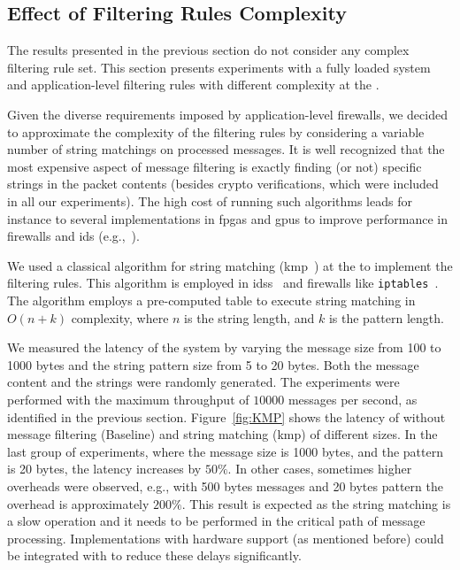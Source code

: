 \subsection{Effect of Filtering Rules Complexity}


The results presented in the previous section do not consider any complex filtering rule set.
This section presents experiments with a fully loaded system and application-level filtering rules with different complexity at the \repsieves.

Given the diverse requirements imposed by application-level firewalls, we decided to approximate the complexity of the filtering rules by considering a variable number of string matchings on processed messages.  It is well recognized that the most expensive aspect of message filtering is exactly finding (or not) specific strings in the packet contents (besides crypto verifications, which were included in all our experiments). 
The high cost of running such algorithms leads for instance to several implementations in \glspl{fpga} and \glspl{gpu} to improve performance in firewalls and \gls{ids} (e.g.,~\cite{Moscola:2003,Lee:2015}).

We used a classical algorithm for string matching (\gls{kmp}~\cite{Knuth:1977}) at the \repsieves to implement the filtering rules.
This algorithm is employed in \glspl{ids}~\cite{Prabha:2014} and firewalls like \texttt{iptables}~\cite{iptables}.
The algorithm employs a pre-computed table to execute string matching in $O(n + k)$ complexity, where $n$ is the string length, and $k$ is the pattern length.


We measured the latency of the system by varying the message size from 100 to 1000 bytes and the string pattern size from 5 to 20 bytes. 
Both the message content and the strings were randomly generated. 
The experiments were performed with the maximum throughput of $10 000$ messages per second, as identified in the previous section. 
Figure~\ref{fig:KMP} shows the latency of \sieveq without message filtering (Baseline) and string matching (\gls{kmp}) of different sizes.
In the last group of experiments, where the message size is 1000 bytes, and the pattern is 20 bytes, the latency increases by $50\%$. 
In other cases, sometimes higher overheads were observed, e.g., with 500 bytes messages and 20 bytes pattern the overhead is approximately $200\%$. 
This result is expected as the string matching is a slow operation and it needs to be performed in the critical path of message processing. 
Implementations with hardware support (as mentioned before) could be integrated with \sieveq to reduce these delays significantly.


